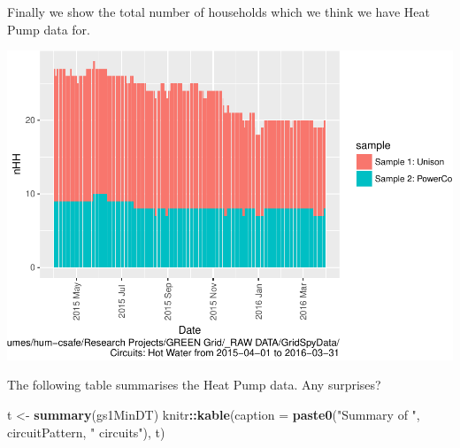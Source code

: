\documentclass[]{article}
\newenvironment{Shaded}{\begin{snugshade}}{\end{snugshade}}
\newcommand{\KeywordTok}[1]{\textcolor[rgb]{0.13,0.29,0.53}{\textbf{#1}}}
\newcommand{\DataTypeTok}[1]{\textcolor[rgb]{0.13,0.29,0.53}{#1}}
\newcommand{\StringTok}[1]{\textcolor[rgb]{0.31,0.60,0.02}{#1}}
\newcommand{\OperatorTok}[1]{\textcolor[rgb]{0.81,0.36,0.00}{\textbf{#1}}}
\newcommand{\NormalTok}[1]{#1}
\begin{document}
Finally we show the total number of households which we think we have
Heat Pump data for.

\includegraphics{nzGGHouseholdPowerDemandProfile_Heat Pump_2015-04-01_2016-03-31_files/figure-latex/liveDataHouseholds-1.pdf}

The following table summarises the Heat Pump data. Any surprises?

\begin{Shaded}
\begin{Highlighting}[]
\NormalTok{t <-}\StringTok{ }\KeywordTok{summary}\NormalTok{(gs1MinDT)}
\NormalTok{knitr}\OperatorTok{::}\KeywordTok{kable}\NormalTok{(}\DataTypeTok{caption =} \KeywordTok{paste0}\NormalTok{(}\StringTok{"Summary of "}\NormalTok{, circuitPattern, }\StringTok{" circuits"}\NormalTok{), t)}
\end{Highlighting}
\end{Shaded}
\end{document}
